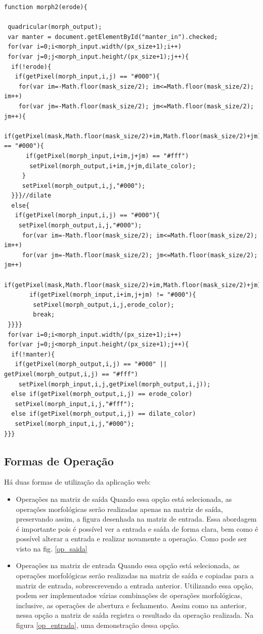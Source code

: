 \documentclass[conference,harvard,brazil,english]{sbatex}
\begin{document}
\begin{lstlisting}
function morph2(erode){
    
 quadricular(morph_output);
 var manter = document.getElementById("manter_in").checked;
 for(var i=0;i<morph_input.width/(px_size+1);i++)
 for(var j=0;j<morph_input.height/(px_size+1);j++){
  if(!erode){
   if(getPixel(morph_input,i,j) == "#000"){
    for(var im=-Math.floor(mask_size/2); im<=Math.floor(mask_size/2); im++)
    for(var jm=-Math.floor(mask_size/2); jm<=Math.floor(mask_size/2); jm++){
     if(getPixel(mask,Math.floor(mask_size/2)+im,Math.floor(mask_size/2)+jm) == "#000"){
      if(getPixel(morph_input,i+im,j+jm) == "#fff")
       setPixel(morph_output,i+im,j+jm,dilate_color);
     }
     setPixel(morph_output,i,j,"#000");
  }}}//dilate
  else{
   if(getPixel(morph_input,i,j) == "#000"){
    setPixel(morph_output,i,j,"#000");
     for(var im=-Math.floor(mask_size/2); im<=Math.floor(mask_size/2); im++)
     for(var jm=-Math.floor(mask_size/2); jm<=Math.floor(mask_size/2); jm++)
      if(getPixel(mask,Math.floor(mask_size/2)+im,Math.floor(mask_size/2)+jm)=="#000")
       if(getPixel(morph_input,i+im,j+jm) != "#000"){
        setPixel(morph_output,i,j,erode_color);
        break;
 }}}}
 for(var i=0;i<morph_input.width/(px_size+1);i++)
 for(var j=0;j<morph_input.height/(px_size+1);j++){
  if(!manter){
   if(getPixel(morph_output,i,j) == "#000" || getPixel(morph_output,i,j) == "#fff")
    setPixel(morph_input,i,j,getPixel(morph_output,i,j));
  else if(getPixel(morph_output,i,j) == erode_color)
   setPixel(morph_input,i,j,"#fff");
  else if(getPixel(morph_output,i,j) == dilate_color)
   setPixel(morph_input,i,j,"#000");
}}}

\end{lstlisting}


\subsection{Formas de Operação}
Há duas formas de utilização da aplicação web:
\begin{itemize}
\item Operações na matriz de saída
Quando essa opção está selecionada, as operações morfológicas serão realizadas apenas na matriz de saída, preservando assim, a figura desenhada na matriz de entrada. Essa abordagem é importante pois é possível ver a entrada e saída de forma clara, bem como é possível alterar a entrada e realizar novamente a operação. Como pode ser visto na fig. \ref{op_saida}

\item Operações na matriz de entrada
Quando essa opção está selecionada, as operações morfológicas serão realizadas na matriz de saída e copiadas para a matriz de entrada, sobrescrevendo a entrada anterior. Utilizando essa opção, podem ser implementados várias combinações de operações morfológicas, inclusive, as operações de abertura e fechamento. Assim como na anterior, nessa opção a matriz de saída registra o resultado da operação realizada. Na  figura \ref{op_entrada}, uma demonstração dessa opção.
\end{itemize}
\end{document}

